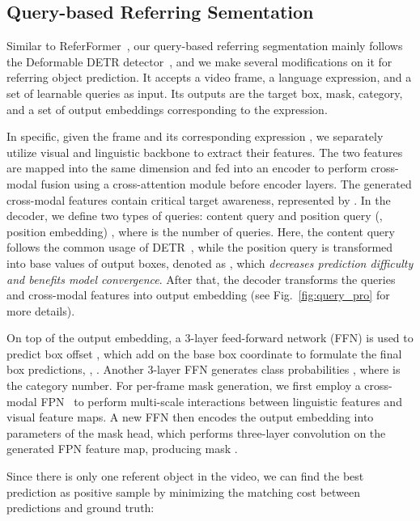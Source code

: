 \documentclass[10pt,twocolumn,letterpaper]{article}
\begin{document}
\subsection{Query-based Referring  Sementation}
\label{sec:query-based referring segmentation}



Similar to ReferFormer~\cite{referformer}, our query-based referring segmentation mainly follows the Deformable DETR detector~\cite{deformable}, and we make several modifications on it for referring object prediction.
It accepts a video frame, a language expression, and a set of learnable queries as input. Its outputs are the target box, mask, category, and a set of output embeddings corresponding to the expression.



In specific,  given the   frame  and its corresponding expression , we separately utilize visual and linguistic backbone to extract their features.
The two features are mapped into the same dimension and fed into an encoder to perform cross-modal fusion using a cross-attention module before encoder layers.
The generated cross-modal features contain critical target awareness, represented by .
In the decoder, we define two types of queries: content query   and position query (\ie, position embedding) ,  where  is the number of queries.
Here, the content query follows the common usage of DETR~\cite{detr}, while the position query is transformed into base values of output boxes, denoted as , which \textit{decreases prediction difficulty and benefits model convergence}.
After that, the decoder transforms the queries and cross-modal features into output embedding  (see Fig.~\ref{fig:query_pro} for more details).


On top of the output embedding, a 3-layer feed-forward network (FFN) is used to predict box offset , which add on the base box coordinate to formulate the final box predictions, \ie, .
Another 3-layer FFN generates class probabilities , where  is the category number.
For per-frame mask generation, we first employ a cross-modal FPN~\cite{referformer} to perform multi-scale interactions between linguistic features and visual feature maps.
A new FFN then encodes the output embedding into parameters of the mask head, which performs three-layer  convolution on the generated FPN feature map, producing mask .

Since there is only one referent object in the video, we can find the best prediction as positive sample by minimizing the matching cost between predictions and ground truth:
\end{document}
